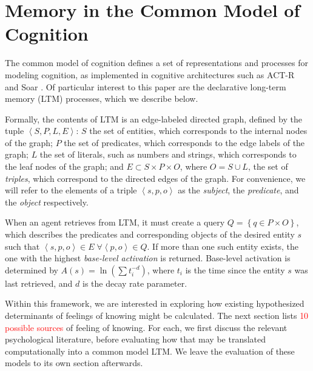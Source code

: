 \documentclass[10pt,letterpaper]{article}
\newcommand{\fixme}[2][]{#2}
\renewcommand{\fixme}[2][]{\textcolor{red}{#2}}
\newcommand{\setof}[1]{\left \{ #1 \right \}}
\newcommand{\tuple}[1]{\left \langle #1 \right \rangle }
\begin{document}

\section{Memory in the Common Model of Cognition}

The common model of cognition \cite{Laird2017AStandardModel} defines a set of representations and processes for modeling cognition, as implemented in cognitive architectures such as ACT-R and Soar \cite{Anderson2007HowCanThe,Laird2012TheSoarCognitive}.
Of particular interest to this paper are the declarative long-term memory (LTM) processes, which we describe below.

Formally, the contents of LTM is an edge-labeled directed graph, defined by the tuple $\tuple{S, P, L, E}$:
$S$ the set of entities, which corresponds to the internal nodes of the graph;
$P$ the set of predicates, which corresponds to the edge labels of the graph;
$L$ the set of literals, such as numbers and strings, which corresponds to the leaf nodes of the graph;
and $E\subset S{\times}P{\times}O$, where $O=S \cup L$, the set of \emph{triples}, which correspond to the directed edges of the graph.
For convenience, we will refer to the elements of a triple $\tuple{s, p, o}$ as the \emph{subject}, the \emph{predicate}, and the \emph{object} respectively.

When an agent retrieves from LTM, it must create a query $Q = \setof{q \in P{\times}O}$, which describes the predicates and corresponding objects of the desired entity $s$ such that $\tuple{s, p, o} \in E \; \forall \tuple{p, o} \in Q$.
If more than one such entity exists, the one with the highest \emph{base-level activation} is returned.
Base-level activation is determined by $A(s) = \ln (\sum {t_i^{-d}})$, where $t_i$ is the time since the entity $s$ was last retrieved, and $d$ is the decay rate parameter.

Within this framework, we are interested in exploring how existing hypothesized determinants of feelings of knowing might be calculated.
The next section lists \fixme{10} \fixme{possible sources} of feeling of knowing.
For each, we first discuss the relevant psychological literature, before evaluating how that may be translated computationally into a common model LTM.
We leave the evaluation of these models to its own section afterwards.
\end{document}
